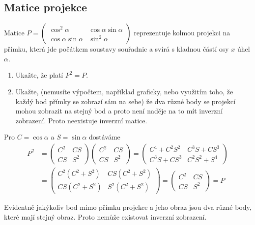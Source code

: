 \subsection{Matice projekce}
Matice $P=
\begin{pmatrix}
  \cos^2 \alpha & \cos \alpha \sin \alpha \\
  \cos\alpha\sin\alpha & \sin^2 \alpha
\end{pmatrix}
$ reprezentuje kolmou projekci na přímku, která jde počátkem soustavy souřadnic a svírá s kladnou částí osy $x$ úhel $\alpha$.
\begin{enumerate}
\item Ukažte, že platí $P^2=P$.
\item Ukažte, (nemusíte výpočtem, například graficky, nebo využitím
  toho, že každý bod přímky se zobrazí sám na sebe) že dva různé body
  se projekcí mohou zobrazit na stejný bod a proto není naděje na to
  mít inverzní zobrazení. Proto neexistuje inverzní matice.
\end{enumerate}

\reseni
Pro $C=\cos \alpha$ a $S=\sin\alpha$ dostáváme
\begin{equation*}
  \begin{aligned}
P^2&=
  \begin{pmatrix}
    C^2 & CS \\CS & S^2
  \end{pmatrix}
  \begin{pmatrix}
    C^2 & CS \\CS & S^2
  \end{pmatrix}
=
\begin{pmatrix}
  C^4+C^2S^2 & C^3S+CS^3 \\
C^3S+CS^3 & C^2S^2+S^4
\end{pmatrix}
\\&=
\begin{pmatrix}
  C^2(C^2+S^2) & CS(C^2+S^2) \\
CS(C^2+S^2) & S^2(C^2+S^2)
\end{pmatrix}
=
\begin{pmatrix}
  C^2 & CS \\
CS & S^2
\end{pmatrix}
=P
\end{aligned}
\end{equation*}

Evidentně jakýkoliv bod mimo přímku projekce a jeho obraz jsou dva různé body, které mají stejný obraz. Proto nemůže existovat inverzní zobrazení.

